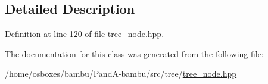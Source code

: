 \subsection{Detailed Description}


Definition at line 120 of file tree\+\_\+node.\+hpp.



The documentation for this class was generated from the following file\+:\begin{DoxyCompactItemize}
\item 
/home/osboxes/bambu/\+Pand\+A-\/bambu/src/tree/\hyperlink{tree__node_8hpp}{tree\+\_\+node.\+hpp}\end{DoxyCompactItemize}
